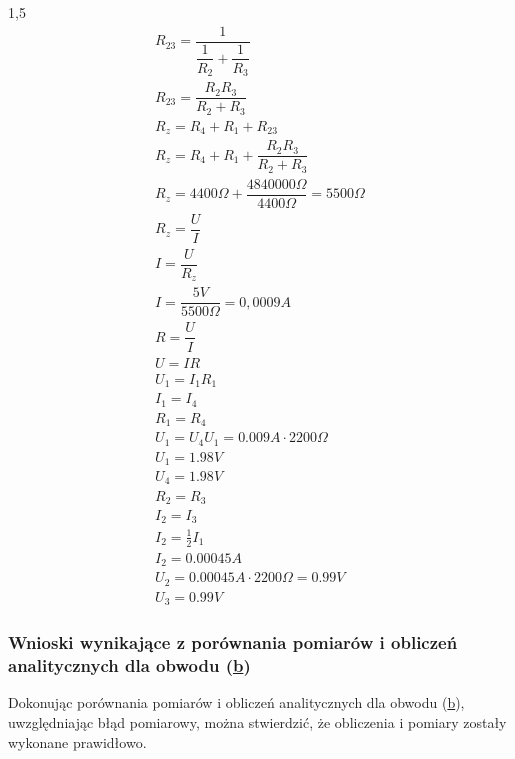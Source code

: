 \documentclass[polish,polish,a4paper]{article}
\begin{document}
\begin{spacing}{1,5}
		\begin{gather*}
		R_{23} = \dfrac{1}{\dfrac{1}{R_{2}} + \dfrac{1}{R_{3}}}\\
		R_{23} = \dfrac{R_{2}R_{3}}{R_{2}+R_{3}}\\
		R_{z} = R_{4} + R_{1} + R_{23}\\
		R_{z} = R_{4} + R_{1} + \dfrac{R_{2}R_{3}}{R_{2}+R_{3}}\\
		R_{z} = 4400\Omega + \dfrac{4840000\Omega}{4400\Omega}	 = 5500\Omega\\
		R_{z} = \dfrac{U}{I}	\\
		I = \dfrac{U}{R_{z}}\\
		I = \dfrac{5V}{5500\Omega} = 0,0009A\\
		R = \dfrac{U}{I}\\
		U = IR\\
		U_{1} = I_{1}R_{1}\\
		I_{1} = I_{4}\\
		R_{1} = R_{4}\\
		U_{1} = U_{4}
		U_{1} = 0.009A \cdot 2200\Omega\\
		U_{1} = 1.98V\\
		U_{4} = 1.98V\\
		R_{2} = R_{3}\\
		I_{2} = I_{3}\\
		I_{2} = \frac{1}{2}I_{1}\\
		I_{2} = 0.00045A\\
		U_{2} = 0.00045A \cdot 2200\Omega = 0.99V\\
		U_{3} = 0.99V
		\end{gather*}
		
		\subsubsection*{Wnioski wynikające z porównania pomiarów i obliczeń analitycznych dla obwodu (\hyperref[eq:ob2b]{b})}
		
						Dokonując porównania pomiarów i obliczeń analitycznych dla obwodu (\hyperref[eq:ob2b]{b}), uwzględniając błąd pomiarowy, można stwierdzić, że obliczenia i pomiary zostały wykonane prawidłowo.
		
		\newpage
		
		\tableofcontents
		
	\end{spacing}
\end{document}
